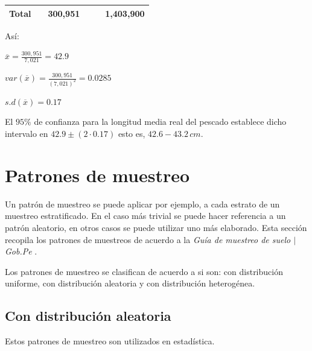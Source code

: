 \documentclass{report}
\begin{document}
\begin{table}[H]
\begin{tabular}{|l|l|l|l|l|l|}
\rowcolor[HTML]{FFCE93} 
Total                                                            &                                                             & 300,951                                                        &                                                                 &                                                                             & 1,403,900                         \\ \hline
\end{tabular}
\end{table}


Así:

\bigbreak

$\overline{x} = \frac{300,951}{7,021} = 42.9$

\bigbreak

$var(\overline{x}) = \frac{300,951}{(7,021)^2} = 0.0285$

\bigbreak

$s.d(\overline{x}) = 0.17$

\bigbreak

El $95\%$ de confianza para la longitud media real del pescado establece dicho intervalo en $42.9 \pm (2 \cdot 0.17)$ esto es, $42.6-43.2 \, cm$.

\section{Patrones de muestreo}

Un patrón de muestreo se puede aplicar por ejemplo, a cada estrato de un muestreo estratificado. En el caso más trivial se puede hacer referencia a un patrón aleatorio, en otros casos se puede utilizar uno más elaborado. Esta sección recopila los patrones de muestreos de acuerdo a la \textit{Guía de muestreo de suelo $\mid$ Gob.Pe} \cite{gobpe-ministerio-del-ambiente-2014}.

\bigbreak

Los patrones de muestreo se clasifican de acuerdo a si son: con distribución uniforme, con distribución aleatoria y con distribución heterogénea.

\subsection{Con distribución aleatoria}

Estos patrones de muestreo son utilizados en estadística.

\bigbreak
\end{document}
